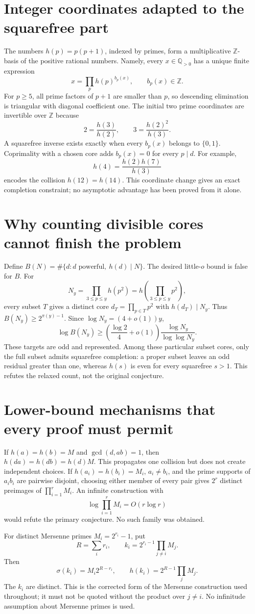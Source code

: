 \section{Integer coordinates adapted to the squarefree part}
The numbers $h(p)=p(p+1)$, indexed by primes, form a multiplicative
$\mathbb Z$-basis of the positive rational numbers. Namely, every $x\in\mathbb Q_{>0}$
has a unique finite expression
\[
 x=\prod_p h(p)^{b_p(x)},\qquad b_p(x)\in\mathbb Z.
\]
For $p\ge5$, all prime factors of $p+1$ are smaller than $p$, so descending
elimination is triangular with diagonal coefficient one. The initial two
prime coordinates are invertible over $\mathbb Z$ because
\[
 2=\frac{h(3)}{h(2)},\qquad 3=\frac{h(2)^2}{h(3)}.
\]
A squarefree inverse exists exactly when every $b_p(x)$ belongs to $\{0,1\}$.
Coprimality with a chosen core adds $b_p(x)=0$ for every $p\mid d$.
For example,
\[
 h(4)=\frac{h(2)h(7)}{h(3)}
\]
encodes the collision $h(12)=h(14)$. This coordinate change gives an exact
completion constraint; no asymptotic advantage has been proved from it alone.

\section{Why counting divisible cores cannot finish the problem}\label{found:badcores}
Define $B(N)=\#\{d:d\text{ powerful},\ h(d)\mid N\}$. The desired little-$o$
bound is false for $B$. For
\[
 N_y=\prod_{3\le p\le y}h(p^2)=h\!\left(\prod_{3\le p\le y}p^2\right),
\]
every subset $T$ gives a distinct core $d_T=\prod_{p\in T}p^2$ with
$h(d_T)\mid N_y$. Thus $B(N_y)\ge2^{\pi(y)-1}$. Since
$\log N_y=(4+o(1))y$,
\[
 \log B(N_y)\ge\left(\frac{\log2}{4}+o(1)\right)
 \frac{\log N_y}{\log\log N_y}.
\]
These targets are odd and represented. Among these particular subset cores,
only the full subset admits squarefree completion: a proper subset leaves an
odd residual greater than one, whereas $h(s)$ is even for every squarefree
$s>1$. This refutes the relaxed count, not the original conjecture.

\section{Lower-bound mechanisms that every proof must permit}
If $h(a)=h(b)=M$ and $\gcd(d,ab)=1$, then $h(da)=h(db)=h(d)M$.
This propagates one collision but does not create independent choices.
If $h(a_i)=h(b_i)=M_i$, $a_i\ne b_i$, and the prime supports of $a_ib_i$
are pairwise disjoint, choosing either member of every pair gives $2^r$
distinct preimages of $\prod_{i=1}^rM_i$.
An infinite construction with
\[
 \log\prod_{i=1}^rM_i=O(r\log r)
\]
would refute the primary conjecture. No such family was obtained.

For distinct Mersenne primes $M_i=2^{r_i}-1$, put
\[
 R=\sum_i r_i,\qquad k_i=2^{r_i-1}\prod_{j\ne i}M_j.
\]
Then
\[
 \sigma(k_i)=M_i2^{R-r_i},\qquad
 \boxed{h(k_i)=2^{R-1}\prod_jM_j.}
\]
The $k_i$ are distinct. This is the corrected form of the Mersenne construction
used throughout; it must not be quoted without the product over $j\ne i$.
No infinitude assumption about Mersenne primes is used.

